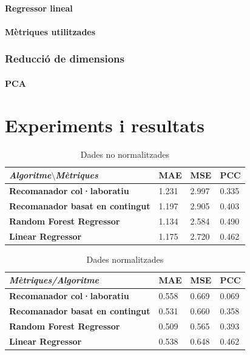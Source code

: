 \documentclass[11pt,a4paper,catalan]{article}
\begin{document}
\paragraph{Regressor lineal}
\paragraph{Mètriques utilitzades}
\subsubsection{Reducció de dimensions}
\paragraph{PCA}
\newpage

\section{Experiments i resultats}

\begin{table}[h]
\centering
\begin{tabular}{@{}llll@{}}
\toprule
\textit{\textbf{Algoritme$\setminus$Mètriques}}   & \textbf{MAE} & \textbf{MSE} & \textbf{PCC} \\ \midrule
\textbf{Recomanador col·laboratiu}      & 1.231        & 2.997        & 0.335        \\
\textbf{Recomanador basat en contingut} & 1.197        & 2.905        & 0.403        \\
\textbf{Random Forest Regressor}        & 1.134        & 2.584        & 0.490        \\
\textbf{Linear Regressor}               & 1.175        & 2.720        & 0.462        \\ \bottomrule
\end{tabular}
\caption{Dades no normalitzades}
\end{table}

\begin{table}[h]
\centering
\begin{tabular}{@{}llll@{}}
\toprule
\textit{\textbf{Mètriques/Algoritme}}   & \textbf{MAE} & \textbf{MSE} & \textbf{PCC} \\ \midrule
\textbf{Recomanador col·laboratiu}      & 0.558        & 0.669        & 0.069        \\
\textbf{Recomanador basat en contingut} & 0.531        & 0.660        & 0.358        \\
\textbf{Random Forest Regressor}        & 0.509        & 0.565        & 0.393        \\
\textbf{Linear Regressor}               & 0.538        & 0.648        & 0.462        \\ \bottomrule
\end{tabular}
\caption{Dades normalitzades}
\end{table}
\end{document}
